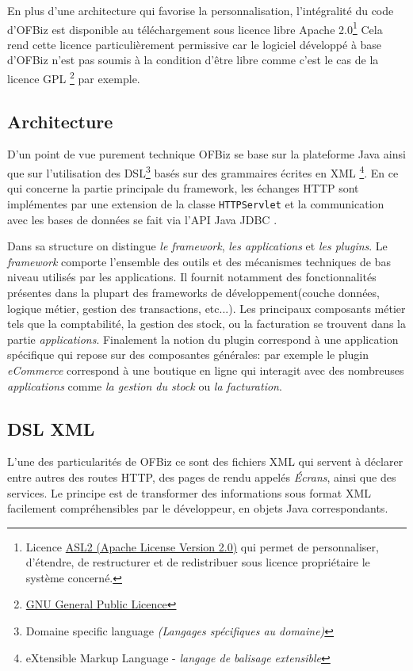 En plus d'une architecture qui favorise la personnalisation, l'intégralité du code d'OFBiz est disponible au téléchargement sous licence libre Apache 2.0\footnote{Licence \href{https://www.apache.org/licenses/LICENSE-2.0.html}{ASL2 (Apache License Version 2.0)} qui permet de personnaliser, d'étendre, de restructurer et de redistribuer sous licence propriétaire le système concerné. } Cela rend cette licence particulièrement permissive car le logiciel développé à base d'OFBiz n'est pas soumis à la condition d'être libre comme c'est le cas de la licence GPL  \footnote{\href{http://www.gnu.org/licenses/gpl-3.0.html}{GNU General Public Licence}} par exemple.

\subsection{Architecture }
\label{architecture}
D'un point de vue purement technique OFBiz se base sur la plateforme Java ainsi que sur l'utilisation des DSL\footnote{Domaine specific language \emph{(Langages spécifiques au domaine)}} basés sur des grammaires écrites en XML \footnote{ eXtensible Markup Language - \emph{langage de balisage extensible}}. En ce qui concerne la partie principale du framework, les échanges HTTP sont implémentes par une extension de la classe \verb=HTTPServlet= \cite{chan2017servlet} et la communication avec les bases de données se fait via l'API Java JDBC \cite{JDBC}.

Dans sa structure on distingue \emph{le framework}, \emph{les applications} et \emph{les plugins}. Le \emph{framework} comporte l'ensemble des outils et des mécanismes techniques de bas niveau utilisés par les applications. Il fournit notamment des fonctionnalités présentes dans la plupart des frameworks de développement(couche données, logique métier, gestion des transactions, etc...).
Les principaux composants métier tels que la comptabilité, la gestion des stock, ou la facturation se trouvent dans la partie \emph{applications}. 
Finalement la notion du plugin  correspond à une application spécifique qui repose sur des composantes générales: par exemple le plugin \emph{eCommerce} correspond à une boutique en ligne qui interagit avec des nombreuses \emph{applications} comme \emph{la gestion du stock} ou \emph{la facturation}. 

\subsection{DSL XML}
\label{dsl}
L'une des particularités de OFBiz ce sont des fichiers XML qui servent à déclarer entre autres
des routes HTTP, des pages de rendu appelés \emph{Écrans}, ainsi que des services. Le principe est de transformer des informations sous format XML facilement compréhensibles par le développeur, en objets Java correspondants. 


